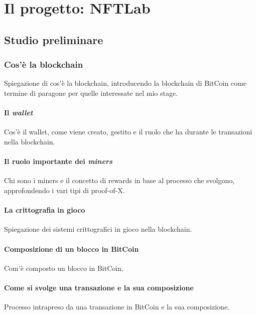 
\chapter{Il progetto: NFTLab}
\label{cap:nftlab}




\section{Studio preliminare}

\subsection{Cos'è la blockchain}
Spiegazione di cos'è la blockchain, introducendo la blockchain di BitCoin come termine di paragone per quelle interessate nel mio stage.

\subsubsection{Il \emph{wallet}}
Cos'è il wallet, come viene creato, gestito e il ruolo che ha durante le transazioni nella blockchain.

\subsubsection{Il ruolo importante dei \emph{miners}}
Chi sono i miners e il concetto di rewards in base al processo che svolgono, approfondendo i vari tipi di proof-of-X.

\subsubsection{La crittografia in gioco}
Spiegazione dei sistemi crittografici in gioco nella blockchain.

\subsubsection{Composizione di un blocco in BitCoin}
Com'è composto un blocco in BitCoin.

\subsubsection{Come si svolge una transazione e la sua composizione}
Processo intrapreso da una transazione in BitCoin e la sua composizione.

